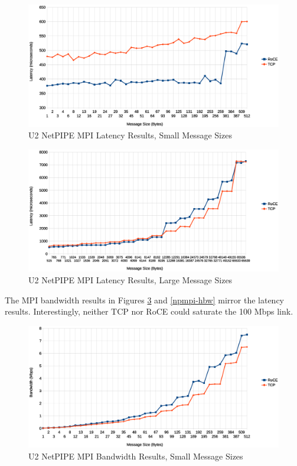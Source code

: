 \documentclass[11pt]{book}
\begin{document}
\begin{figure}
\includegraphics[width=\textwidth]{netpipe_lat_small}
\caption{U2 NetPIPE MPI Latency Results, Small Message Sizes}\label{npmpi-llat}
\end{figure}

\begin{figure}
\includegraphics[width=\textwidth]{netpipe_lat_large}
\caption{U2 NetPIPE MPI Latency Results, Large Message Sizes}\label{npmpi-hlat}
\end{figure}

The MPI bandwidth results in Figures \ref{npmpi-lbw} and \ref{npmpi-hbw} mirror the
latency results.  Interestingly, neither TCP nor RoCE could saturate the 100 Mbps link.

\begin{figure}
\includegraphics[width=\textwidth]{netpipe_bw_small}
\caption{U2 NetPIPE MPI Bandwidth Results, Small Message Sizes}\label{npmpi-lbw}
\end{figure}
\end{document}
